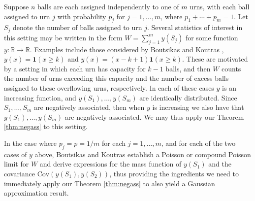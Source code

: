 \documentclass[12pt]{article}
\begin{document}
Suppose $n$ balls are each assigned independently to one of $m$ urns, with each ball assigned to urn $j$ with probability $p_j$ for $j=1,\ldots,m$, where $p_1+\cdots+p_m=1$. Let $S_j$ denote the number of balls assigned to urn $j$. Several statistics of interest in this setting may be written in the form $W=\sum_{j=1}^my(S_j)$ for some function $y:\mathbb{R}\to\mathbb{R}$. Examples include those considered by Boutsikas and Koutras \cite{boutsikas02b}, $y(x)=\mathbf{1}(x\geq k)$ and $y(x)=(x-k+1)\mathbf{1}(x\geq k)$. These are motivated by a setting in which each urn has capacity for $k-1$ balls, and then $W$ counts the number of urns exceeding this capacity and the number of excess balls assigned to these overflowing urns, respectively. In each of these cases $y$ is an increasing function, and $y(S_1),\ldots,y(S_m)$ are identically distributed. Since $S_1,\ldots,S_m$ are negatively associated, then when $y$ is increasing we also have that $y(S_1),\ldots,y(S_m)$ are negatively associated. We may thus apply our Theorem \ref{thm:negass} to this setting.

In the case where $p_j=p=1/m$ for each $j=1,\ldots,m$, and for each of the two cases of $y$ above, Boutsikas and Koutras \cite{boutsikas02b} establish a Poisson or compound Poisson limit for $W$ and derive expressions for the mass function of $y(S_1)$ and the covariance $\text{Cov}(y(S_1),y(S_2))$, thus providing the ingredients we need to immediately apply our Theorem \ref{thm:negass} to also yield a Gaussian approximation result. 
\end{document}
